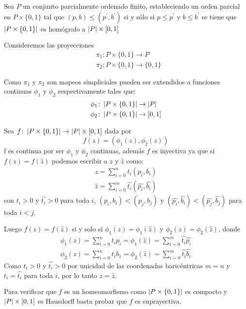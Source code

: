 \begin{Teo}
Sea $P$ un conjunto parcialmente ordenado finito, estableciendo un orden parcial en $P\times\{0,1\}$ tal que $(p,b)\leq (p^{'},b^{'})$ si y sólo si $p\leq p^{'}$ y $b\leq b^{'}$ se tiene que $\left| P\times\{0,1\} \right|$ es homógrafo a $\left| P \right|\times[0,1]$
\end{Teo} 
\begin{Dem}

Consideremos las proyecciones
\begin{align*}
&\pi_1\colon P\times\{0,1\} \rightarrow P\\
&\pi_2\colon P\times\{0,1\} \rightarrow \{0,1\}
\end{align*}

Como $\pi_1$ y $\pi_2$ son mapeos simpliciales pueden ser extendidos a funciones continuas $\phi_1$ y $\phi_2$ respectivamente tales que:
\begin{align*}
&\phi_1\colon\left| P\times\{0,1\} \right| \rightarrow \left| P \right|\\
&\phi_2\colon\left| P\times\{0,1\} \right| \rightarrow [0,1]
\end{align*}

Sea $f\colon\left| P\times \{0,1\} \right| \rightarrow \left| P \right|\times [0,1]$ dada por 
\begin{equation*}
f(z)= (\phi_1(z),\phi_2(z))
\end{equation*}
f es continua por ser $\phi_1$ y $\phi_2$ continuas, además $f$ es inyectiva ya que si $f(z)=f(\hat{z})$ podemos escribir a $z$ y $\hat{z}$ como:
\begin{eqnarray}
z = \sum_{i=0}^{n}t_i(p_i,b_i)\\
\hat{z} = \sum_{i=0}^{m}\hat{t_i}(\hat{p_i},\hat{b_i})
\end{eqnarray} 
con $t_i>0$ y $\hat{t_i}>0$ para toda $i$, $(p_i,b_i)<(p_j,b_j)$ y $(\hat{p_i},\hat{b_i})<(\hat{p_j},\hat{b_j})$ para toda $i<j$.

Luego $f(z) = f(\hat{z})$ si y solo si $\phi_1(z)=\phi_1(\hat{z})$ y $\phi_2(z)=\phi_2(\hat{z})$, donde 
\begin{eqnarray}
\phi_1(z) = \sum_{i=0}^{n}t_ip_i = \phi_1(\hat{z}) = \sum_{i=0}^{m}\hat{t_i}\hat{p_i}\\
\phi_2(z) = \sum_{i=0}^{n}t_ib_1 = \phi_2(\hat{z}) = \sum_{i=0}^{m}\hat{t_i}\hat{b_i}
\end{eqnarray}
Como $t_i>0$ y $\hat{t_i}>0$ por unicidad de las coordenadas baricéntricas $m=n$ y $t_i = \hat{t_i}$ para toda $i$, por lo tanto $z = \hat{z}$.

Para verificar que $f$ es un homeomorfismo como $\left| P\times\{0,1\} \right|$ es compacto y $\left| P \right|\times[0,1]$ es Hausdorff basta probar que $f$ es suprayectiva. 


\end{Dem}
